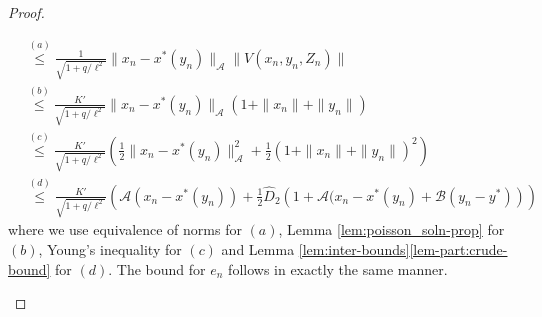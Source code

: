 \documentclass[10pt,a4paper]{amsart}
\newcommand{\Acal}{\mathcal{A}}
\newcommand{\Bcal}{\mathcal{B}}
\newcommand{\hD}{\hat{D}}
\newcommand{\xstar}{x^*}
\begin{document}
\begin{proof}
\begin{enumerate}[label=(\alph*)]
\begin{align*}
        &\stackrel{(a)}{\leq} \frac{1}{\sqrt{1+q/\ell^2}}\|x_n-\xstar(y_n)\|_\Acal\|V(x_n,y_n,Z_n)\|\\
        &\stackrel{(b)}{\leq} \frac{K'}{\sqrt{1+q/\ell^2}}\|x_n-\xstar(y_n)\|_\Acal(1+\|x_n\|+\|y_n\|)\\
        &\stackrel{(c)}{\leq} \frac{K'}{\sqrt{1+q/\ell^2}}\left(\frac{1}{2}\|x_n-\xstar(y_n)\|_\Acal^2+\frac{1}{2}(1+\|x_n\|+\|y_n\|)^2\right)\\
        &\stackrel{(d)}{\leq} \frac{K'}{\sqrt{1+q/\ell^2}}\left(\Acal(x_n-\xstar(y_n))+\frac{1}{2}\hD_2\left(1+\Acal(x_n-x^*(y_n)+\Bcal(y_n-y^*)\right)\right)
    \end{align*}
    where we use equivalence of norms for $(a)$, Lemma \ref{lem:poisson_soln-prop} for $(b)$, Young's inequality for $(c)$ and Lemma \ref{lem:inter-bounds}\ref{lem-part:crude-bound} for $(d)$. The bound for $e_n$ follows in exactly the same manner.
    \end{enumerate}
\end{proof}
\end{document}
